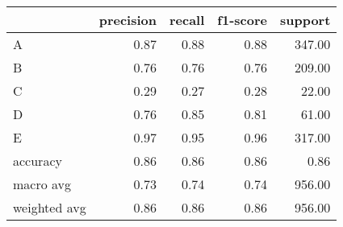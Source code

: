 \begin{tabular}{|l|r|r|r|r|}
\hline
{} &  precision &  recall &  f1-score &  support \\
\hline
A            &       0.87 &    0.88 &      0.88 &   347.00 \\
B            &       0.76 &    0.76 &      0.76 &   209.00 \\
C            &       0.29 &    0.27 &      0.28 &    22.00 \\
D            &       0.76 &    0.85 &      0.81 &    61.00 \\
E            &       0.97 &    0.95 &      0.96 &   317.00 \\
accuracy     &       0.86 &    0.86 &      0.86 &     0.86 \\
macro avg    &       0.73 &    0.74 &      0.74 &   956.00 \\
weighted avg &       0.86 &    0.86 &      0.86 &   956.00 \\
\hline
\end{tabular}
